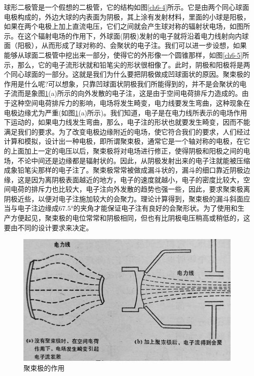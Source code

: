 球形二极管是一个假想的二极管，它的结构如图\ref{ch6-4}所示。它是由两个同心球面电极构成的，外边大球的内表面为阴极，其上涂有发射材料，里面的小球是阳极，如果在两个电极上加上直流电压，它们之间就会产生球对称的辐射状电场，如图所示。在这个辐射电场的作用下，外球面(阴极)发射的电子就将沿着电力线射向内球面（阳极），从而形成了球对称的、会聚状的电子注。我们可以进一步设想，如果能够从球面二极管中挖出来一部分，使得它的外形像一个圆锥那样，如图\ref{ch6-5}所示，那么，它的电子流形状就和铅笔尖的形状很相像了。此时，阴极和阳极将是两个同心球面的一部分。这就是我们为什么要把阴极做成凹球面状的原因。聚束极的作用是什么呢?可以想象，只靠凹球面状阴极我们所能得到的，并不是会聚状的电子流而是象图\ref{ch6-6}(a)所示的向外发散的电子注，这是由于空间电荷排斥力造成的。由于这种空间电荷排斥力的影响，电场将发生畸变，电力线要发生弯曲，这种现象在电极边缘尤为严重(如图\ref{ch6-6}(a)所示)。我们知道，电子是在电力线所表示的电场作用下运动的，如果电力线发生弯曲，那么，电子注的形状也就要发生畸变，因而不能满足我们的要求。为了改变电极边缘附近的电场，使它符合我们的要求，人们经过计算和模拟，设计出一种电极，即所谓聚束极，通常它是一个轴对称的电极，在它的上面加上一定的电压以后，聚束极将对电场进行修正，使得阴极和阳极之间的电场，不论中间还是边缘都是辐射状的。因此，从阴极发射出来的电子注就能被压缩成象铅笔尖那样的电子注了。聚束极常常被做成漏斗状的，漏斗的细口靠近阴极边缘，这是因为离阴极表面越近的地方，电子的速度就越小，电子的密度比较大，空间电荷的排斥力也比较大，电子注向外发散的趋势也强一些，因此，要求聚束极离阴极近些，以便对电子注施加较大的会聚力。理论计算得到，聚束极的漏斗斜面应当与电子注边缘成$ \ang{67.5} $的夹角才能保证电子注有良好的会聚形状。为了使用和生产方便起见，聚束极的电位常常和阴极相同，但也有比阴极电压稍高或稍低的，这要由不同的设计要求来决定。

\begin{figure}[phtb]
	\centering
	\includegraphics[width=0.75\linewidth]{figure/ch6-6}
	\caption{聚束极的作用}
	\label{ch6-6}
\end{figure}

